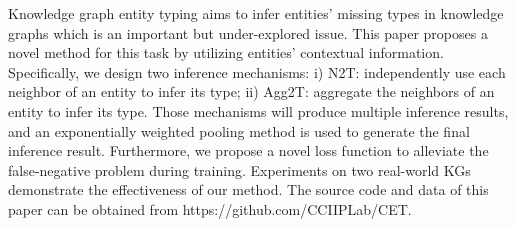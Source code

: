 Knowledge graph entity typing aims to infer entities' missing types in knowledge graphs which is an important but under-explored issue. This paper proposes a novel method for this task by utilizing entities' contextual information. Specifically, we design two inference mechanisms: i) N2T: independently use each neighbor of an entity to infer its type; ii) Agg2T: aggregate the neighbors of an entity to infer its type. Those mechanisms will produce multiple inference results, and an exponentially weighted pooling method is used to generate the final inference result. Furthermore, we propose a novel loss function to alleviate the false-negative problem during training. Experiments on two real-world KGs demonstrate the effectiveness of our method. The source code and data of this paper can be obtained from https://github.com/CCIIPLab/CET.
